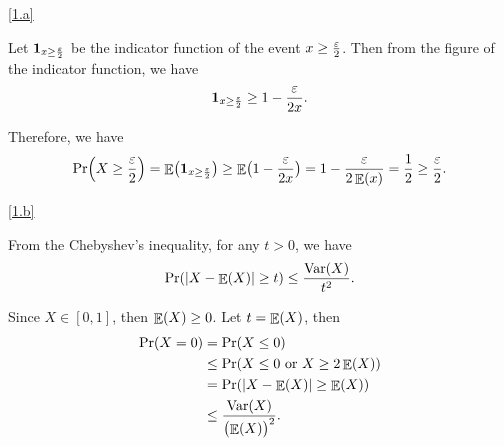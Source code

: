 \documentclass{homework}
\begin{document}
\begin{solution}

  \ref{1.a}

  Let $\mathbf{1}_{x \ge \frac{\varepsilon}{2}}$ be the indicator function of the event $x \ge \frac{\varepsilon}{2}$.
  Then from the figure of the indicator function, we have
  \begin{equation*}
    \mathbf{1}_{x \ge \frac{\varepsilon}{2}} \ge 1 - \frac{\varepsilon}{2x}.
  \end{equation*}

  \begin{center}
  \end{center}

  Therefore, we have
  \begin{equation*}
    \Pr \Bigl(X \ge \frac{\varepsilon}{2} \Bigr)
    = \mathop{\mathbb{E}}\displaylimits \bigl( \mathbf{1}_{x \ge \frac{\varepsilon}{2}} \bigr) 
    \ge \mathop{\mathbb{E}}\displaylimits \bigl( 1 - \frac{\varepsilon}{2x} \bigr) = 1 - \frac{\varepsilon}{2\mathop{\mathbb{E}}\displaylimits(x)}
    = \frac{1}{2} \ge \frac{\varepsilon}{2}.
  \end{equation*}

  \ref{1.b}

  From the Chebyshev's inequality, for any $t > 0$, we have
  \begin{equation*}
    \Pr(\left\lvert X - \mathop{\mathbb{E}}\displaylimits(X) \right\rvert \ge t) \le \frac{\mathop{\mathrm{Var}}\displaylimits(X)}{t^2}.
  \end{equation*}

  Since $X \in [0, 1]$, then $\mathop{\mathbb{E}}\displaylimits(X) \ge 0$. Let $t = \mathop{\mathbb{E}}\displaylimits(X)$, then
  \begin{align*}
    \Pr(X = 0) & = \Pr(X \le 0) \\
    & \le \Pr(X \le 0 \text{ or } X \ge 2\mathop{\mathbb{E}}\displaylimits(X)) \\
    & = \Pr(\left\lvert X - \mathop{\mathbb{E}}\displaylimits(X) \right\rvert \ge \mathop{\mathbb{E}}\displaylimits(X)) \\
    & \le \frac{\mathop{\mathrm{Var}}\displaylimits(X)}{{\bigl(\mathop{\mathbb{E}}\displaylimits(X)\bigr)}^{2}}.
  \end{align*}

\end{solution}
\end{document}
